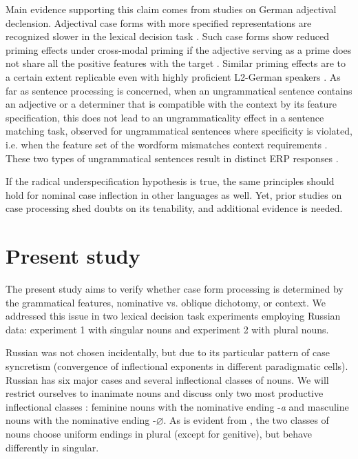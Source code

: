 \documentclass[output=paper, modfonts,newtxmath,hidelinks]{langscibook}
\begin{document}
Main evidence supporting this claim comes from studies on German adjectival declension. Adjectival case forms with more specified representations are recognized slower in the lexical decision task \citep{clahsen2001mental}. Such case forms show reduced priming effects under cross-modal priming if the adjective serving as a prime does not share all the positive features with the target \citep{clahsen2001mental}. Similar priming effects are to a certain extent replicable even with highly proficient L2-German speakers \citep{bosch2016accessing, bosch2017time}. As far as sentence processing is concerned, when an ungrammatical sentence contains an adjective or a determiner that is compatible with the context by its feature specification, this does not lead to an ungrammaticality effect in a sentence matching task, observed for ungrammatical sentences where specificity is violated, i.e. when the feature set of the wordform mismatches context requirements \citep{penke2004psycholinguistic}. These two types of ungrammatical sentences result in distinct ERP responses \citep{opitz2013neurophysiological}. 

If the radical underspecification hypothesis is true, the same principles should hold for nominal case inflection in other languages as well. Yet, prior studies on case processing shed doubts on its tenability, and additional evidence is needed.

\section{Present study}\label{sec:2}
The present study aims to verify whether case form processing is determined by the grammatical features, nominative vs. oblique dichotomy, or context. We addressed this issue in two lexical decision task experiments employing Russian data: experiment 1 with singular nouns and experiment 2 with plural nouns.

Russian was not chosen incidentally, but due to its particular pattern of case syncretism (convergence of inflectional exponents in different paradigmatic cells). Russian has six major cases and several inflectional classes of nouns. We will restrict ourselves to inanimate nouns and discuss only two most productive inflectional classes \citep{wiese2004categories}: feminine nouns with the nominative ending -\textit{a} and masculine nouns with the nominative  ending -$\varnothing$. As is evident from , the two classes of nouns choose uniform endings in plural (except for genitive), but behave differently in singular.
\end{document}
